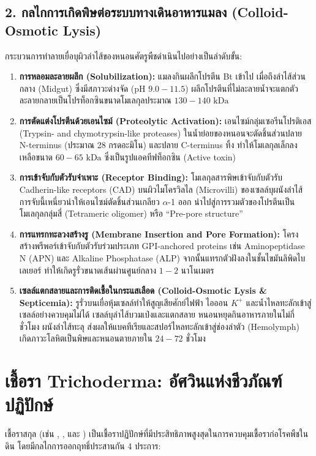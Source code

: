 \subsection{2. กลไกการเกิดพิษต่อระบบทางเดินอาหารแมลง (Colloid-Osmotic Lysis)}
กระบวนการทำลายเยื่อบุผิวลำไส้ของหนอนศัตรูพืชดำเนินไปอย่างเป็นลำดับขั้น:
\begin{enumerate}
    \item \textbf{การหลอมละลายผลึก (Solubilization):} แมลงกินผลึกโปรตีน Bt เข้าไป เมื่อถึงลำไส้ส่วนกลาง (Midgut) ซึ่งมีสภาวะด่างจัด ($\text{pH } 9.0 - 11.5$) ผลึกโปรตีนที่ไม่ละลายน้ำจะแตกตัวละลายกลายเป็นโปรท็อกซินขนาดโมเลกุลประมาณ $130 - 140\text{ kDa}$
    \item \textbf{การตัดแต่งโปรตีนด้วยเอนไซม์ (Proteolytic Activation):} เอนไซม์กลุ่มเซอรีนโปรติเอส (Trypsin- and chymotrypsin-like proteases) ในน้ำย่อยของหนอนจะตัดชิ้นส่วนปลาย N-terminus (ประมาณ 28 กรดอะมิโน) และปลาย C-terminus ทิ้ง ทำให้โมเลกุลเล็กลงเหลือขนาด $60 - 65\text{ kDa}$ ซึ่งเป็นรูปแอคทีฟท็อกซิน (Active toxin)
    \item \textbf{การเข้าจับกับตัวรับจำเพาะ (Receptor Binding):} โมเลกุลสารพิษเข้าจับกับตัวรับ Cadherin-like receptors (CAD) บนผิวไมโครวิลไล (Microvilli) ของเซลล์บุผนังลำไส้ การจับนี้เหนี่ยวนำให้เอนไซม์ตัดชิ้นส่วนเกลียว $\alpha$-1 ออก นำไปสู่การรวมตัวของโปรตีนเป็นโมเลกุลกลุ่มสี่ (Tetrameric oligomer) หรือ ``Pre-pore structure''
    \item \textbf{การแทรกทะลวงสร้างรู (Membrane Insertion and Pore Formation):} โครงสร้างพรีพอร์เข้าจับกับตัวรับร่วมประเภท GPI-anchored proteins เช่น Aminopeptidase N (APN) และ Alkaline Phosphatase (ALP) จากนั้นแทรกตัวฝังลงในชั้นไขมันลิพิดไบเลเยอร์ ทำให้เกิดรูรั่วขนาดเส้นผ่านศูนย์กลาง $1 - 2\text{ นาโนเมตร}$
    \item \textbf{เซลล์แตกสลายและการติดเชื้อในกระแสเลือด (Colloid-Osmotic Lysis \& Septicemia):} รูรั่วบนเยื่อหุ้มเซลล์ทำให้สูญเสียศักย์ไฟฟ้า ไอออน $K^+$ และน้ำไหลทะลักเข้าสู่เซลล์อย่างควบคุมไม่ได้ เซลล์บุลำไส้บวมเป่งและแตกสลาย หนอนหยุดกินอาหารภายในไม่กี่ชั่วโมง ผนังลำไส้ทะลุ ส่งผลให้แบคทีเรียและสปอร์ไหลทะลักเข้าสู่ช่องลำตัว (Hemolymph) เกิดภาวะโลหิตเป็นพิษและหนอนตายภายใน $24 - 72\text{ ชั่วโมง}$
\end{enumerate}

\section{เชื้อรา Trichoderma: อัศวินแห่งชีวภัณฑ์ปฏิปักษ์}

เชื้อราสกุล  (เช่น , , และ ) เป็นเชื้อราปฏิปักษ์ที่มีประสิทธิภาพสูงสุดในการควบคุมเชื้อราก่อโรคพืชในดิน โดยมีกลไกการออกฤทธิ์ประสานกัน 4 ประการ:

